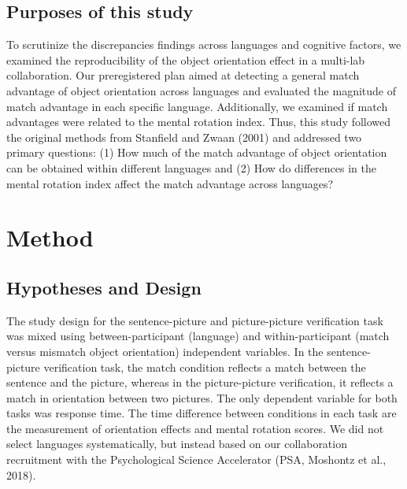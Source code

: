 \documentclass[
  man]{apa7}
\begin{document}
\hypertarget{purposes-of-this-study}{%
\subsection{Purposes of this study}\label{purposes-of-this-study}}

To scrutinize the discrepancies findings across languages and cognitive factors, we examined the reproducibility of the object orientation effect in a multi-lab collaboration. Our preregistered plan aimed at detecting a general match advantage of object orientation across languages and evaluated the magnitude of match advantage in each specific language. Additionally, we examined if match advantages were related to the mental rotation index. Thus, this study followed the original methods from Stanfield and Zwaan (2001) and addressed two primary questions: (1) How much of the match advantage of object orientation can be obtained within different languages and (2) How do differences in the mental rotation index affect the match advantage across languages?

\hypertarget{method}{%
\section{Method}\label{method}}

\hypertarget{hypotheses-and-design}{%
\subsection{Hypotheses and Design}\label{hypotheses-and-design}}

The study design for the sentence-picture and picture-picture verification task was mixed using between-participant (language) and within-participant (match versus mismatch object orientation) independent variables. In the sentence-picture verification task, the match condition reflects a match between the sentence and the picture, whereas in the picture-picture verification, it reflects a match in orientation between two pictures. The only dependent variable for both tasks was response time. The time difference between conditions in each task are the measurement of orientation effects and mental rotation scores. We did not select languages systematically, but instead based on our collaboration recruitment with the Psychological Science Accelerator (PSA, Moshontz et al., 2018).
\end{document}
